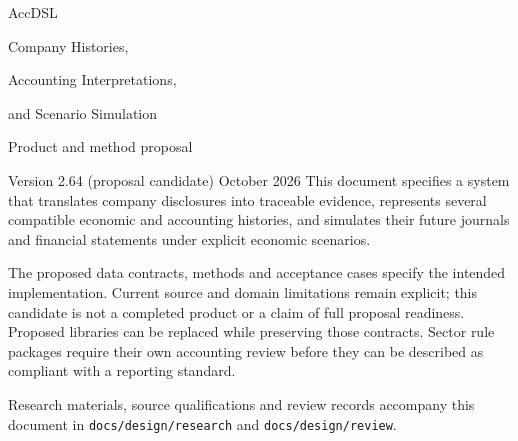 \documentclass[11pt,a4paper]{report}
\newcommand{\code}[1]{\texttt{#1}}
\begin{document}
\hypersetup{pageanchor=false}
\begin{titlepage}
\vspace*{20mm}
{\sffamily\color{ink}\Huge AccDSL\par}
\vspace{7mm}
{\LARGE Company Histories,\par Accounting Interpretations,\par and Scenario Simulation\par}
\vspace{12mm}
{\Large Product and method proposal\par}
\vspace{5mm}
Version 2.64 (proposal candidate)  October 2026
\vfill
This document specifies a system that translates company disclosures into
traceable evidence, represents several compatible economic and accounting
histories, and simulates their future journals and financial statements under
explicit economic scenarios.

The proposed data contracts, methods and acceptance cases specify the intended
implementation. Current source and domain limitations remain explicit; this
candidate is not a completed product or a claim of full proposal readiness. Proposed libraries can be replaced while preserving those
contracts. Sector rule packages require their own accounting review before
they can be described as compliant with a reporting standard.

\vspace{8mm}
Research materials, source qualifications and review records accompany this
document in \code{docs/design/research} and \code{docs/design/review}.
\end{titlepage}
\hypersetup{pageanchor=true}
\tableofcontents
\clearpage{}














\appendix




\begingroup\raggedright

\endgroup
\end{document}
